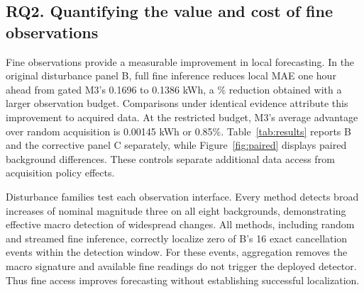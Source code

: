 \documentclass[conference]{IEEEtran}
\begin{document}
\subsection{RQ2. Quantifying the value and cost of fine observations}
Fine observations provide a measurable improvement in local forecasting. In the original disturbance panel B, full fine inference reduces local MAE one hour ahead from gated M3's 0.1696 to 0.1386 kWh, a \FineGainPercent{}\% reduction obtained with a larger observation budget. Comparisons under identical evidence attribute this improvement to acquired data. At the restricted budget, M3's average advantage over random acquisition is 0.00145 kWh or 0.85\%. Table~\ref{tab:results} reports B and the corrective panel C separately, while Figure~\ref{fig:paired} displays paired background differences. These controls separate additional data access from acquisition policy effects.

Disturbance families test each observation interface. Every method detects broad increases of nominal magnitude three on all eight backgrounds, demonstrating effective macro detection of widespread changes. All methods, including random and streamed fine inference, correctly localize zero of B's 16 exact cancellation events within the detection window. For these events, aggregation removes the macro signature and available fine readings do not trigger the deployed detector. Thus fine access improves forecasting without establishing successful localization.

\begin{table}[!t]
\caption{Fine observations improve forecasts without establishing an acquisition advantage. Results use recorded episode artifacts. B is the original disturbance panel and C the corrective panel. Local MAE one hour ahead is in kWh per affected household, using 80 local episodes in B and 12 in C. Detection and correct group localization use all 96 and 12 demand episodes, respectively. Control alarms use unmodified episodes. Delay includes misses at 3.5 h. Representations receiving identical evidence match their source policy and are omitted as duplicate rows.}
\label{tab:results}\centering

\end{table}
\end{document}
